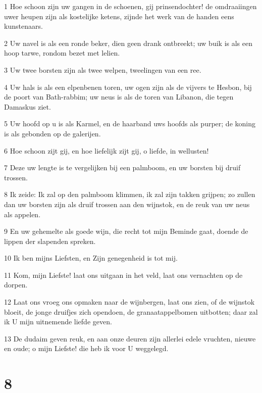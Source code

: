 \par 1 Hoe schoon zijn uw gangen in de schoenen, gij prinsendochter! de omdraaiingen uwer heupen zijn als kostelijke ketens, zijnde het werk van de handen eens kunstenaars.
\par 2 Uw navel is als een ronde beker, dien geen drank ontbreekt; uw buik is als een hoop tarwe, rondom bezet met lelien.
\par 3 Uw twee borsten zijn als twee welpen, tweelingen van een ree.
\par 4 Uw hals is als een elpenbenen toren, uw ogen zijn als de vijvers te Hesbon, bij de poort van Bath-rabbim; uw neus is als de toren van Libanon, die tegen Damaskus ziet.
\par 5 Uw hoofd op u is als Karmel, en de haarband uws hoofds als purper; de koning is als gebonden op de galerijen.
\par 6 Hoe schoon zijt gij, en hoe liefelijk zijt gij, o liefde, in wellusten!
\par 7 Deze uw lengte is te vergelijken bij een palmboom, en uw borsten bij druif trossen.
\par 8 Ik zeide: Ik zal op den palmboom klimmen, ik zal zijn takken grijpen; zo zullen dan uw borsten zijn als druif trossen aan den wijnstok, en de reuk van uw neus als appelen.
\par 9 En uw gehemelte als goede wijn, die recht tot mijn Beminde gaat, doende de lippen der slapenden spreken.
\par 10 Ik ben mijns Liefsten, en Zijn genegenheid is tot mij.
\par 11 Kom, mijn Liefste! laat ons uitgaan in het veld, laat ons vernachten op de dorpen.
\par 12 Laat ons vroeg ons opmaken naar de wijnbergen, laat ons zien, of de wijnstok bloeit, de jonge druifjes zich opendoen, de granaatappelbomen uitbotten; daar zal ik U mijn uitnemende liefde geven.
\par 13 De dudaim geven reuk, en aan onze deuren zijn allerlei edele vruchten, nieuwe en oude; o mijn Liefste! die heb ik voor U weggelegd.

\chapter{8}

